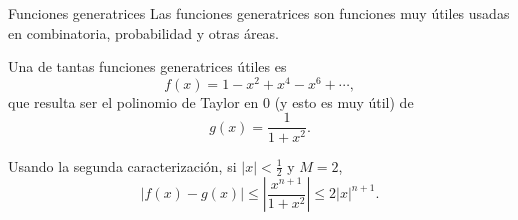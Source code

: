 \begin{frame}{Funciones generatrices}
  Las funciones generatrices son funciones muy útiles usadas en
  combinatoria, probabilidad y otras áreas.

  Una de tantas funciones generatrices útiles es
  \[
    f(x) = 1 - x^2 + x^4 - x^6 + \cdots,
  \]
  que resulta ser el polinomio de Taylor en $0$ (y esto es muy útil) de
  \[
    g(x) = \frac{1}{1 + x^2}.
  \]

  Usando la segunda caracterización, si $\lvert x \rvert < \frac{1}{2}$ y
  $M = 2$,
  \[
    \lvert f(x) - g(x) \rvert 
    \leq \left\lvert \frac{x^{n + 1}}{1 + x^2} \right\rvert
    \leq 2 \lvert x \rvert^{n + 1}.
  \]
\end{frame}
